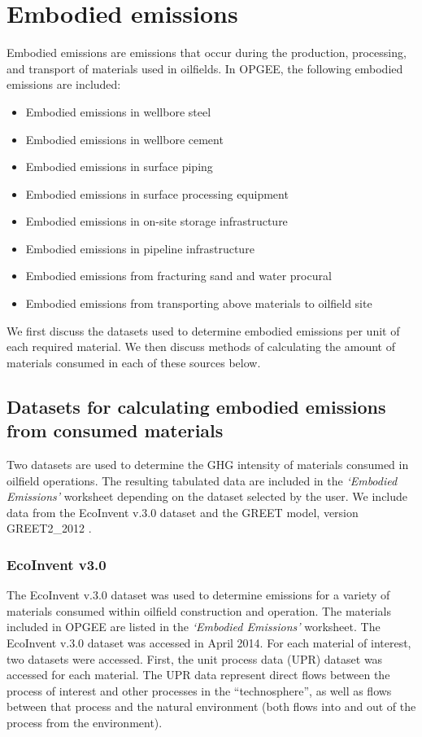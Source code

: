 \documentclass[11pt]{report}
\newcommand{\sheet}[1]{\textit{`{#1}'}}
\begin{document}
\section{Embodied emissions} \label{sec:embodied_emissions}

Embodied emissions are emissions that occur during the production, processing, and transport of materials used in oilfields. In OPGEE, the following embodied emissions are included:
\begin{itemize}
\item Embodied emissions in wellbore steel
\item Embodied emissions in wellbore cement
\item Embodied emissions in surface piping
\item Embodied emissions in surface processing equipment
\item Embodied emissions in on-site storage infrastructure
\item Embodied emissions in pipeline infrastructure
\item Embodied emissions from fracturing sand and water procural
\item Embodied emissions from transporting above materials to oilfield site
\end{itemize}

We first discuss the datasets used to determine embodied emissions per unit of each required material. We then discuss methods of calculating the amount of materials consumed in each of these sources below. 

\subsection{Datasets for calculating embodied emissions from consumed materials}

Two datasets are used to determine the GHG intensity of materials consumed in oilfield operations. The resulting tabulated data are included in the \sheet{Embodied Emissions} worksheet depending on the dataset  selected by the user. We include data from the EcoInvent v.3.0 dataset \cite{ecoinvent2014} and the GREET model, version GREET2\_2012 \cite{Wang2012}.

\subsubsection{EcoInvent v3.0}

The EcoInvent v.3.0 dataset was used to determine emissions for a variety of materials consumed within oilfield construction and operation. The materials included in OPGEE are listed in the \sheet{Embodied Emissions} worksheet. The EcoInvent v.3.0 dataset was accessed in April 2014. For each material of interest, two datasets were accessed. First, the unit process data (UPR) dataset was accessed for each material. The UPR data represent direct flows between the process of interest and other processes in the ``technosphere'', as well as flows between that process and the natural environment (both flows into and out of the process from the environment).
\end{document}
